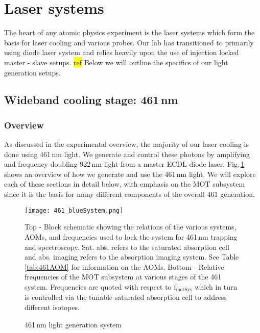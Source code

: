 \pagebreak
\section{Laser systems}\label{sec:laser_systems}
\setcounter{footnote}{0}
The heart of any atomic physics experiment is the laser systems which form the basis for laser cooling and various probes.
Our lab has transitioned to primarily using diode laser system and relies heavily upon the use of injection locked master - slave setups. \hl{ref}
Below we will outline the specifics of our light generation setups.

\subsection{Wideband cooling stage: 461\,nm} \label{ssec:461sys}
\subsubsection{Overview}
As discussed in the experimental overview, the majority of our laser cooling is done using 461\,nm light. 
We generate and control these photons by amplifying and frequency doubling 922\,nm light from a master ECDL diode laser. 
Fig.\,\ref{fig:461blockSys} shows an overview of how we generate and use the 461\,nm light.
We will explore each of these sections in detail below, with emphasis on the MOT subsystem since it is the basis for many different components of the overall 461 generation.
	\begin{figure}
		\centerline{
		\texttt{[image: 461\_blueSystem.png]}}
		\caption{461\,nm light generation system}{Top - Block schematic showing the relations of the various systems, AOMs, and frequencies used to lock the system for 461\,nm trapping and spectroscopy. Sat. abs. refers to the saturated absorption cell and abs. imaging refers to the absorption imaging system. See Table \ref{tab:461AOM} for information on the AOMs. Bottom - Relative frequencies of the MOT subsystem at various stages of the 461 system. Frequencies are quoted with respect to f$_{\text{motSys}}$ which in turn is controlled via the tunable saturated absorption cell to address different isotopes.}
		\label{fig:461blockSys}
	\end{figure} 

